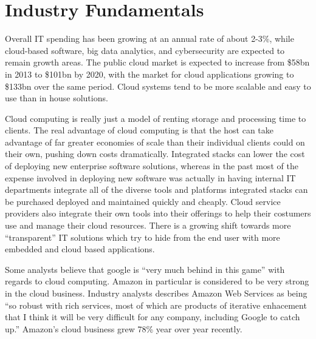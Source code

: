 \section*{Industry Fundamentals}

Overall IT spending has been growing at an annual rate of about 2-3\%, while cloud-based software, big data analytics, and cybersecurity are expected to remain growth areas.\autocite[]{CloudAnalyticsCybersecurityApplication}\autocite[]{CIOIntro}
The public cloud market is expected to increase from \$58bn in 2013 to \$101bn by 2020, with the market for cloud applications growing to \$133bn over the same period.\autocite[]{CIOIntro}
Cloud systems tend to be more scalable and easy to use than in house solutions.\autocite[]{CIOIntro}

Cloud computing is really just a model of renting storage and processing time to clients.\autocite[]{AftermathOfIntegratedStack}
The real advantage of cloud computing is that the host can take advantage of far greater economies of scale than their individual clients could on their own, pushing down costs dramatically.\autocite[]{AftermathOfIntegratedStack}
Integrated stacks can lower the cost of deploying new enterprise software solutions, whereas in the past most of the expense involved in deploying new software was actually in having internal IT departments integrate all of the diverse tools and platforms integrated stacks can be purchased deployed and maintained quickly and cheaply.\autocite[]{AftermathOfIntegratedStack}
Cloud service providers also integrate their own tools into their offerings to help their costumers use and manage their cloud resources.\autocite[]{AftermathOfIntegratedStack}
There is a growing shift towards more ``transparent'' IT solutions which try to hide from the end user with more embedded and cloud based applications.\autocite[]{OptimismInnovation}

Some analysts believe that google is ``very much behind in this game'' with regards to cloud computing.\autocite[]{GoogleCloudBoost}
Amazon in particular is considered to be very strong in the cloud business.  Industry analysts describes Amazon Web Services as being ``so robust with rich services, most of which are products of iterative enhacement that I think it will be very difficult for any company, including Google to catch up.''\autocite[]{GoogleCloudBoost}
Amazon's cloud business grew 78\% year over year recently.\autocite[]{GoogleCloudBoost}

